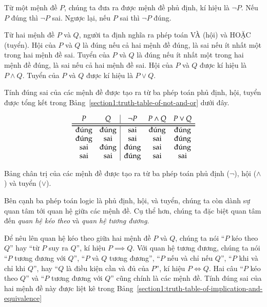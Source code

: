 Từ một mệnh đề $P$, chúng ta đưa ra được mệnh đề phủ định, kí hiệu là $\neg P$. Nếu $P$ đúng thì $\neg P$ sai. Ngược lại, nếu $P$ sai thì $\neg P$ đúng.

Từ hai mệnh đề $P$ và $Q$, người ta định nghĩa ra phép toán VÀ (hội) và HOẶC (tuyển). Hội của $P$ và $Q$ là đúng nếu cả hai mệnh đề đúng, là sai nếu ít nhất một trong hai mệnh đề sai. Tuyển của $P$ và $Q$ là đúng nếu ít nhất một trong hai mệnh đề đúng, là sai nếu cả hai mệnh đề sai. Hội của $P$ và $Q$ được kí hiệu là $P\wedge Q$. Tuyển của $P$ và $Q$ được kí hiệu là $P\vee Q$.

Tính đúng sai của các mệnh đề được tạo ra từ ba phép toán phủ định, hội, tuyển được tổng kết trong Bảng~\ref{section1:truth-table-of-not-and-or} dưới đây.
\begin{table}[htp]
    \centering
    \[
        \begin{array}{cc|ccc}
            P           & Q           & \neg P      & P\wedge Q   & P\vee Q     \\
            \toprule
            \bottomrule
            \text{đúng} & \text{đúng} & \text{sai}  & \text{đúng} & \text{đúng} \\
            \text{đúng} & \text{sai}  & \text{sai}  & \text{sai}  & \text{đúng} \\
            \text{sai}  & \text{đúng} & \text{đúng} & \text{sai}  & \text{đúng} \\
            \text{sai}  & \text{sai}  & \text{đúng} & \text{sai}  & \text{sai}
        \end{array}
    \]
    \caption{Bảng chân trị của các mệnh đề được tạo ra từ ba phép toán phủ định ($\neg$), hội ($\wedge$) và tuyển ($\vee$).}\label{section1:truth-table-of-not-and-or}
\end{table}

Bên cạnh ba phép toán logic là phủ định, hội, và tuyển, chúng ta còn dành sự quan tâm tới quan hệ giữa các mệnh đề. Cụ thể hơn, chúng ta đặc biệt quan tâm đến \textit{quan hệ kéo theo} và \textit{quan hệ tương đương}.

Để nêu lên quan hệ kéo theo giữa hai mệnh đề $P$ và $Q$, chúng ta nói ``$P$ kéo theo $Q$'' hay ``từ $P$ suy ra $Q$'', kí hiệu $P\implies Q$. Với quan hệ tương đương, chúng ta nói ``$P$ tương đương với $Q$'', ``$P$ và $Q$ tương đương'', ``$P$ nếu và chỉ nếu $Q$'', ``$P$ khi và chỉ khi $Q$'', hay ``$Q$ là điều kiện cần và đủ của $P$'', kí hiệu $P\Leftrightarrow Q$. Hai câu ``$P$ kéo theo $Q$'' và ``$P$ tương đương với $Q$'' cũng chính là các mệnh đề. Tính đúng sai của hai mệnh đề này được liệt kê trong Bảng~\ref{section1:truth-table-of-implication-and-equivalence}

